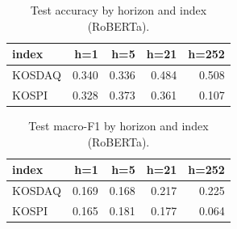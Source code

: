 \begin{table}[t]\centering
\caption{Test accuracy by horizon and index (RoBERTa).}
\begin{tabular}{lrrrr}
\toprule
index & h=1 & h=5 & h=21 & h=252 \\
\midrule
KOSDAQ & 0.340 & 0.336 & 0.484 & 0.508 \\
KOSPI & 0.328 & 0.373 & 0.361 & 0.107 \\
\bottomrule
\end{tabular}
\end{table}

\begin{table}[t]\centering
\caption{Test macro-F1 by horizon and index (RoBERTa).}
\begin{tabular}{lrrrr}
\toprule
index & h=1 & h=5 & h=21 & h=252 \\
\midrule
KOSDAQ & 0.169 & 0.168 & 0.217 & 0.225 \\
KOSPI & 0.165 & 0.181 & 0.177 & 0.064 \\
\bottomrule
\end{tabular}
\end{table}